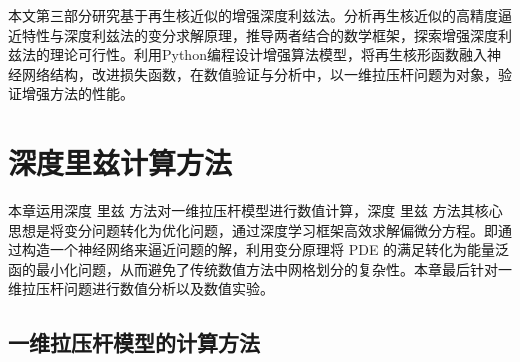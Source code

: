 \documentclass[engineeringmaster]{hquThesis}
\begin{document}
本文第三部分研究基于再生核近似的增强深度利兹法。分析再生核近似的高精度逼近特性与深度利兹法的变分求解原理，推导两者结合的数学框架，探索增强深度利兹法的理论可行性。利用Python编程设计增强算法模型，将再生核形函数融入神经网络结构，改进损失函数，在数值验证与分析中，以一维拉压杆问题为对象，验证增强方法的性能。

\clearpage

\newpage
\chapter{深度里兹计算方法}
本章运用深度 里兹 方法对一维拉压杆模型进行数值计算，深度 里兹 方法其核心思想是将变分问题转化为优化问题，通过深度学习框架高效求解偏微分方程。即通过构造一个神经网络来逼近问题的解，利用变分原理将 PDE 的满足转化为能量泛函的最小化问题，从而避免了传统数值方法中网格划分的复杂性。本章最后针对一维拉压杆问题进行数值分析以及数值实验。

\section{一维拉压杆模型的计算方法}
\end{document}
